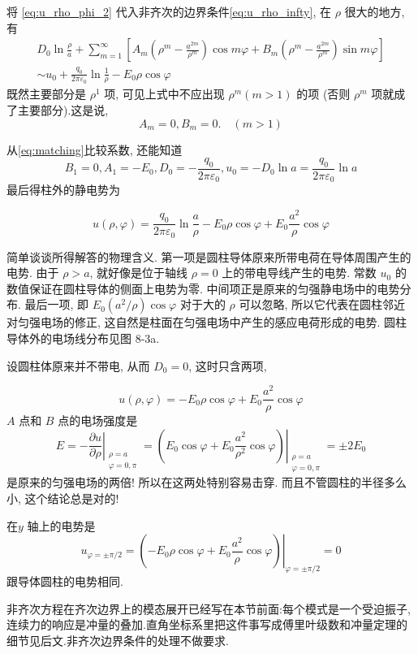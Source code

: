 将 \eqref{eq:u_rho_phi_2} 代入非齐次的边界条件\eqref{eq:u_rho_infty}, 在 $\rho$ 很大的地方, 有
\begin{equation}
    \begin{gathered}
        D_{0} \ln \frac{\rho}{a}+\sum_{m=1}^{\infty}\left[A_{m}\left(\rho^{m}-\frac{a^{2 m}}{\rho^{m}}\right) \cos m \varphi+B_{m}\left(\rho^{m}-\frac{a^{2 m}}{\rho^{m}}\right) \sin m \varphi\right] \\
        \sim u_{0}+\frac{q_{0}}{2 \pi \varepsilon_{0}} \ln \frac{1}{\rho}-E_{0} \rho \cos \varphi
    \end{gathered}
    \label{eq:matching}
\end{equation}
既然主要部分是 $\rho^{1}$ 项, 可见上式中不应出现 $\rho^{m}(m>1)$ 的项 (否则 $\rho^{m}$ 项就成了主要部分).这是说,
$$
A_{m}=0, B_{m}=0 . \quad(m>1)
$$

从\eqref{eq:matching}比较系数, 还能知道
$$
B_{1}=0, A_{1}=-E_{0}, D_{0}=-\frac{q_{0}}{2 \pi \varepsilon_{0}}, 
u_{0}=-D_{0} \ln a=\frac{q_{0}}{2 \pi \varepsilon_{0}} \ln a
$$
最后得柱外的静电势为

$$
u(\rho, \varphi)=\frac{q_{0}}{2 \pi \varepsilon_{0}} \ln \frac{a}{\rho}-E_{0} \rho \cos \varphi+E_{0} \frac{a^{2}}{\rho} \cos \varphi
$$

简单谈谈所得解答的物理含义. 
第一项是圆柱导体原来所带电荷在导体周围产生的电势. 
由于 $\rho>a$, 就好像是位于轴线 $\rho=0$ 上的带电导线产生的电势. 
常数 $u_{0}$ 的数值保证在圆柱导体的侧面上电势为零. 中间项正是原来的匀强静电场中的电势分布. 
最后一项, 即 $E_{0}\left(a^{2} / \rho\right) \cos \varphi$ 对于大的 $\rho$ 可以忽略,
所以它代表在圆柱邻近对匀强电场的修正, 这自然是柱面在匀强电场中产生的感应电荷形成的电势. 圆柱导体外的电场线分布见图 8-3a.

设圆柱体原来并不带电, 从而 $D_{0}=0$, 这时只含两项,

$$
u(\rho, \varphi)=-E_{0} \rho \cos \varphi+E_{0} \frac{a^{2}}{\rho} \cos \varphi
$$
$A$ 点和 $B$ 点的电场强度是
$$
E=-\left.\frac{\partial u}{\partial \rho}\right|_{\substack{\rho=a \\ \varphi=0, \pi}}
=\left.\left(E_{0} \cos \varphi+E_{0} \frac{a^{2}}{\rho^{2}} \cos \varphi\right)\right|_{\substack{\rho=a \\ \varphi=0, \pi}}
= \pm 2 E_{0}
$$
是原来的匀强电场的两倍! 所以在这两处特别容易击穿. 而且不管圆柱的半径多么小, 这个结论总是对的!

在$y$ 轴上的电势是
$$
u_{\varphi= \pm \pi / 2}=\left.\left(-E_{0} \rho \cos \varphi+E_{0} \frac{a^{2}}{\rho} \cos \varphi\right)\right|_{\varphi= \pm \pi / 2}=0
$$
跟导体圆柱的电势相同. 

非齐次方程在齐次边界上的模态展开已经写在本节前面:每个模式是一个受迫振子,连续力的响应是冲量的叠加.直角坐标系里把这件事写成傅里叶级数和冲量定理的细节见后文.非齐次边界条件的处理不做要求.
